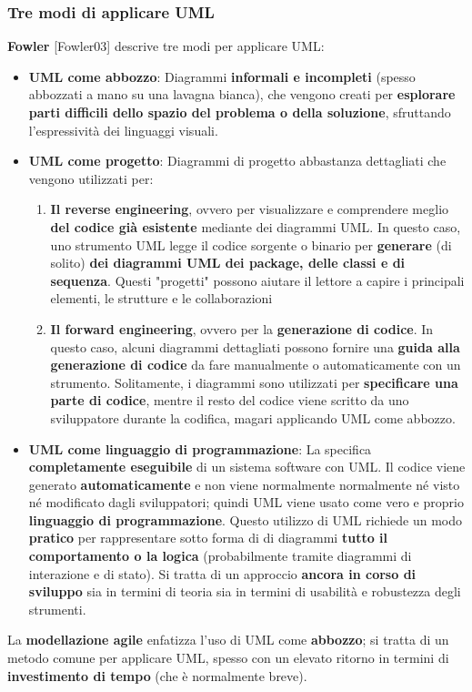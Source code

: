 \documentclass[12pt]{article}
\begin{document}
\subsubsection{Tre modi di applicare UML}
\textbf{Fowler} [Fowler03] descrive tre modi per applicare UML:
\begin{itemize}
    \item \textbf{UML come abbozzo}: Diagrammi \textbf{informali e incompleti} (spesso abbozzati a mano su una lavagna bianca), che vengono creati per 
    \textbf{esplorare parti difficili dello spazio del problema o della soluzione}, sfruttando l'espressività dei linguaggi visuali.
    \item \textbf{UML come progetto}: Diagrammi di progetto abbastanza dettagliati che vengono utilizzati per:
    \begin{enumerate}
        \item \textbf{Il reverse engineering}, ovvero per visualizzare e comprendere meglio \textbf{del codice già esistente} mediante dei diagrammi UML. In questo caso, uno strumento UML legge il codice
        sorgente o binario per \textbf{generare} (di solito) \textbf{dei diagrammi UML dei package, delle classi e di sequenza}. Questi "progetti" possono aiutare il lettore a capire i principali elementi, le strutture e le collaborazioni
        \item \textbf{Il forward engineering}, ovvero per la \textbf{generazione di codice}. In questo caso, alcuni diagrammi dettagliati possono fornire una \textbf{guida alla generazione di codice} da fare manualmente o automaticamente con un strumento.
        Solitamente, i diagrammi sono utilizzati per \textbf{specificare una parte di codice}, mentre il resto del codice viene scritto da uno sviluppatore durante la codifica, magari applicando UML come abbozzo.
    \end{enumerate}
    \item \textbf{UML come linguaggio di programmazione}: La specifica \textbf{completamente eseguibile} di un sistema software con UML.
    Il codice viene generato \textbf{automaticamente} e non viene normalmente normalmente né visto né modificato dagli sviluppatori; quindi UML viene usato come vero e proprio \textbf{linguaggio di programmazione}.
    Questo utilizzo di UML richiede un modo \textbf{pratico} per rappresentare sotto forma di di diagrammi \textbf{tutto il comportamento o la logica} (probabilmente tramite diagrammi di interazione e di stato).
    Si tratta di un approccio \textbf{ancora in corso di sviluppo} sia in termini di teoria sia in termini di usabilità e robustezza degli strumenti.
\end{itemize}
La \textbf{modellazione agile} enfatizza l'uso di UML come \textbf{abbozzo}; si tratta di un metodo comune per applicare UML, spesso con un elevato ritorno in termini di \textbf{investimento di tempo} (che è normalmente breve).
\end{document}

